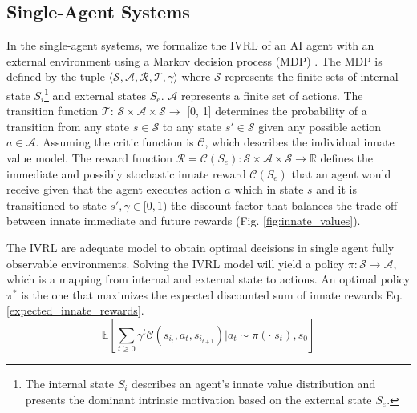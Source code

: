 \documentclass[letterpaper]{article} %
\begin{document}
\subsection{Single-Agent Systems}

In the single-agent systems, we formalize the IVRL of an AI agent with an external environment using a Markov decision process (MDP) \cite{puterman2014markov}. The MDP is defined by the tuple $\langle \mathcal{S, A, R, T,} \gamma \rangle$ where $\mathcal{S}$ represents the finite sets of internal state $S_i$\footnote{The internal state $S_i$ describes an agent's innate value distribution and presents the dominant intrinsic motivation based on the external state $S_e$.} and external states $S_e$. $\mathcal{A}$ represents a finite set of actions. The transition function $\mathcal{T}$: $\mathcal{S} \times \mathcal{A} \times \mathcal{S} \rightarrow$ [0, 1] determines the probability of a transition from any state $s \in \mathcal{S}$ to any state $s' \in \mathcal{S}$ given any possible action $a \in \mathcal{A}$. Assuming the critic function is $\mathcal{C}$, which describes the individual innate value model. The reward function $\mathcal{R} = \mathcal{C}(S_e): \mathcal{S} \times \mathcal{A} \times \mathcal{S} \rightarrow \mathbb{R}$ defines the immediate and possibly stochastic innate reward $\mathcal{C}(S_e)$ that an agent would receive given that the agent executes action $a$ which in state $s$ and it is transitioned to state $s', \gamma \in [0, 1)$ the discount factor that balances the trade-off between innate immediate and future rewards (Fig. \ref{fig:innate_values}).

The IVRL are adequate model to obtain optimal decisions in single agent fully observable environments. Solving the IVRL model will yield a policy $\pi: \mathcal{S} \rightarrow \mathcal{A}$, which is a mapping from internal and external state to actions. An optimal policy $\pi^*$ is the one that maximizes the expected discounted sum of innate rewards Eq. \eqref{expected_innate_rewards}. 
\begin{equation}
    \mathbb{E} \left[\sum_{t \geq 0} \gamma^t \mathcal{C}(s_{i_t}, a_t, s_{i_{t+1}}) \bigg\vert a_t \sim \pi(\cdot \vert s_t), s_0 \right]
\label{expected_innate_rewards}
\end{equation}
\end{document}
